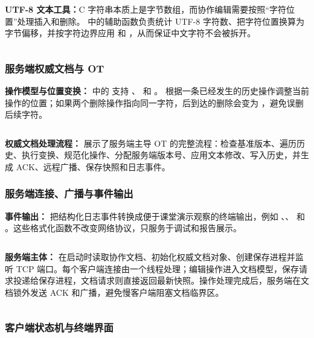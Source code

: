 \inputminted[firstline=1,lastline=566,firstnumber=1]{c}{code/cowork/protocol.c}

\textbf{UTF-8 文本工具：}C 字符串本质上是字节数组，而协作编辑需要按照“字符位置”处理插入和删除。 中的辅助函数负责统计 UTF-8 字符数、把字符位置换算为字节偏移，并按字符边界应用  和 ，从而保证中文字符不会被拆开。

\inputminted[firstline=1,lastline=260,firstnumber=1]{c}{code/cowork/util.c}

\subsubsection{服务端权威文档与 OT}

\textbf{操作模型与位置变换：} 中的  支持 、 和 。 根据一条已经发生的历史操作调整当前操作的位置；如果两个删除操作指向同一字符，后到达的删除会变为 ，避免误删后续字符。

\inputminted[firstline=1,lastline=322,firstnumber=1]{c}{code/cowork/document.c}

\textbf{权威文档处理流程：} 展示了服务端主导 OT 的完整流程：检查基准版本、遍历历史、执行变换、规范化操作、分配服务端版本号、应用文本修改、写入历史，并生成 ACK、远程广播、保存快照和日志事件。

\subsubsection{服务端连接、广播与事件输出}

\textbf{事件输出：} 把结构化日志事件转换成便于课堂演示观察的终端输出，例如 、、 和 。这些格式化函数不改变网络协议，只服务于调试和报告展示。

\inputminted[firstline=1,lastline=95,firstnumber=1]{c}{code/cowork/events.c}

\textbf{服务端主体：} 在启动时读取协作文档、初始化权威文档对象、创建保存进程并监听 TCP 端口。每个客户端连接由一个线程处理；编辑操作进入文档模型，保存请求投递给保存进程，文档请求则直接返回最新快照。操作处理完成后，服务端在文档锁外发送 ACK 和广播，避免慢客户端阻塞文档临界区。

\inputminted[firstline=1,lastline=482,firstnumber=1]{c}{code/cowork/server.c}

\subsubsection{客户端状态机与终端界面}

